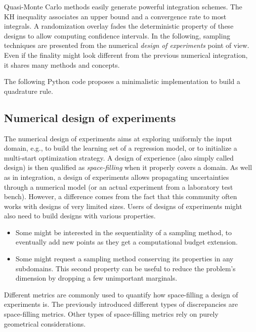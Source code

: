 Quasi-Monte Carlo methods easily generate powerful integration schemes. 
The KH inequality associates an upper bound and a convergence rate to most integrals. 
A randomization overlay fades the deterministic property of these designs to allow computing confidence intervals.
In the following, sampling techniques are presented from the numerical \textit{design of experiments} point of view. 
Even if the finality might look different from the previous numerical integration, it shares many methods and concepts. 


\begin{otexample}
    The following Python code proposes a minimalistic \ot implementation to build a quadrature rule. 
\end{otexample}


\subsection{Numerical design of experiments}
The numerical design of experiments aims at exploring uniformly the input domain, e.g., to build the learning set of a regression model, or to initialize a multi-start optimization strategy. 
A design of experience (also simply called design) is then qualified as \textit{space-filling} when it properly covers a domain. 
As well as in integration, a design of experiments allows propagating uncertainties through a numerical model (or an actual experiment from a laboratory test bench). 
However, a difference comes from the fact that this community often works with designs of very limited sizes. 
Users of designs of experiments might also need to build designs with various properties. 
\begin{itemize}
    \item Some might be interested in the sequentiality of a sampling method, to eventually add new points as they get a computational budget extension.
    \item Some might request a sampling method conserving its properties in any subdomains. 
    This second property can be useful to reduce the problem's dimension by dropping a few unimportant marginals.
\end{itemize}

Different metrics are commonly used to quantify how space-filling a design of experiments is. 
The previously introduced different types of discrepancies are space-filling metrics.
Other types of space-filling metrics rely on purely geometrical considerations.  

